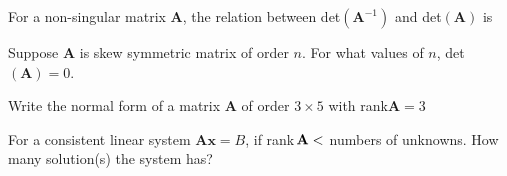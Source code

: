 \documentclass[12pt]{examdesign}
\begin{document}
\begin{fillin}[title={~}]
  
\begin{question}
  For a non-singular matrix $\textbf{A}$, the relation between\; det$(\textbf{A}^{-1})$ and det$(\textbf{A})$  is 
\end{question}
\begin{question}
Suppose $\textbf{A}$ is skew symmetric matrix of order $n$. For what values of $n$, \;det$(\textbf{A})=0$. 
\end{question}
\begin{question}
 Write the normal form of a matrix $\textbf{A}$ of order $3\times 5$ with rank$\textbf{A}=3$ 
\end{question}
\begin{question}
 For a consistent linear system $\textbf{Ax}={B}$, if \;rank$\,{\bf A}<$ numbers of unknowns. How many solution(s) the system has? 
\end{question}
\end{fillin}
\end{document}
